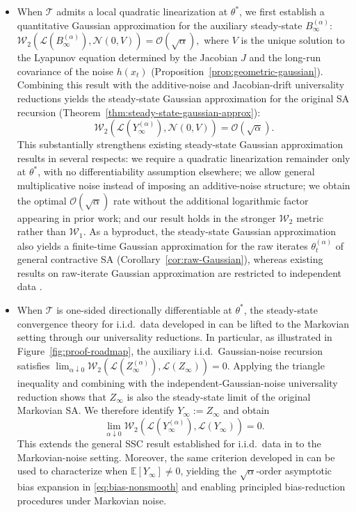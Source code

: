 \documentclass[11pt,letterpaper]{article}
\theoremstyle{plain}
\theoremstyle{definition}
\theoremstyle{remark}
\newcommand{\E}{\mathbb{E}}
\newcommand{\mT}{\mathcal{T}}
\newcommand{\W}{\mathcal{W}}
\newcommand{\law}{\mathcal{L}}
\begin{document}
\begin{itemize}
    \item 
    When $\mT$ admits a local quadratic linearization at $\theta^*$, we first establish a
    quantitative Gaussian approximation for the auxiliary steady-state
    $B_\infty^{(\alpha)}$: $\W_2\!\left(
            \law\!\left(B_\infty^{(\alpha)}\right),
            \mathcal N(0,V)
        \right)
        =
        \mathcal O(\sqrt{\alpha}),$ where $V$ is the unique solution to the Lyapunov equation determined by
    the Jacobian
    $J$ and the long-run covariance of the 
    noise $h(x_t)$
    (Proposition~\ref{prop:geometric-gaussian}). Combining this result with the additive-noise and Jacobian-drift universality
reductions yields the steady-state Gaussian approximation for the
original SA recursion (Theorem~\ref{thm:steady-state-gaussian-approx}):
\[
    \W_2\!\left(
        \law\!\left(Y_\infty^{(\alpha)}\right),
        \mathcal N(0,V)
    \right)
    =
    \mathcal O(\sqrt{\alpha}).
\]
    This substantially strengthens existing steady-state Gaussian approximation
results in several respects: we require a quadratic linearization remainder
only at $\theta^*$, with no differentiability assumption elsewhere; we allow general
multiplicative noise instead of imposing an additive-noise structure; we
obtain the optimal $\mathcal O(\sqrt{\alpha})$ rate without the additional
logarithmic factor appearing in prior work; and our result holds in the
stronger $\W_2$ metric rather than $\W_1$. As a byproduct, the steady-state Gaussian approximation also yields a
finite-time Gaussian approximation for the raw iterates
\(\theta_t^{(\alpha)}\) of general contractive SA
(Corollary~\ref{cor:raw-Gaussian}), whereas existing results on raw-iterate
Gaussian approximation are restricted to independent data
\cite{wei2026gaussian,haque2026accurately}.

    \item 
   When $\mT$ is one-sided
directionally
differentiable at $\theta^*$, the steady-state
convergence theory for i.i.d.\ data developed in
\cite{zhang2024prelimit} can be lifted to the Markovian setting through our
universality reductions. In particular, as illustrated in
Figure~\ref{fig:proof-roadmap}, the auxiliary i.i.d.\ Gaussian-noise recursion
satisfies $\lim_{\alpha\downarrow 0}
    \W_2\!\left(
        \law\!\left(Z_\infty^{(\alpha)}\right),
        \law(Z_\infty)
    \right)
    =
    0.$ Applying the triangle inequality and combining with the independent-Gaussian-noise universality reduction shows that $Z_\infty$ is also the steady-state
limit of the original Markovian SA. We therefore identify
$Y_\infty:=Z_\infty$ and obtain
\[
    \lim_{\alpha\downarrow 0}
    \W_2\!\left(
        \law\!\left(Y_\infty^{(\alpha)}\right),
        \law(Y_\infty)
    \right)
    =
    0.
\]
This extends the general SSC result established for i.i.d.\ data in
\cite{zhang2024prelimit} to the Markovian-noise setting. Moreover, the same
criterion developed in \cite{zhang2024prelimit} can be used to characterize
when \(\E[Y_\infty]\neq 0\), yielding the
\(\sqrt{\alpha}\)-order asymptotic bias expansion in
\eqref{eq:bias-nonsmooth} and enabling principled bias-reduction procedures
under Markovian noise.
\end{itemize}
\end{document}
